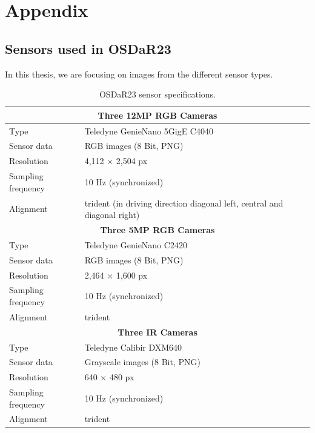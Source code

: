 \documentclass[Master,MDS,english]{BASE/twbook} %
\begin{document}
    
    

\clearpage


\appendix
\chapter{Appendix}

\section{Sensors used in OSDaR23} \label{app:sensors}

In this thesis, we are focusing on images from the different sensor types. 

\begin{table}[H]
  \centering
  \footnotesize
  \begin{tabular}{|l|l|}
    \hline
    \multicolumn{2}{|c|}{\textbf{Three 12MP RGB Cameras}}  \\
    \hline
    Type & Teledyne GenieNano 5GigE C4040  \\
    Sensor data & RGB images (8 Bit, PNG)  \\
    Resolution & 4,112 $\times$ 2,504 px  \\
    Sampling frequency & 10 Hz (synchronized)  \\
    Alignment & trident (in driving direction diagonal left, central and diagonal right)  \\
    \hline
    \multicolumn{2}{|c|}{\textbf{Three 5MP RGB Cameras}}  \\
    \hline
    Type & Teledyne GenieNano C2420  \\
    Sensor data & RGB images (8 Bit, PNG)  \\
    Resolution & 2,464 $\times$ 1,600 px \\
    Sampling frequency & 10 Hz (synchronized)  \\
    Alignment & trident  \\
    \hline
    \multicolumn{2}{|c|}{\textbf{Three IR Cameras}}  \\
    \hline
    Type & Teledyne Calibir DXM640  \\
    Sensor data & Grayscale images (8 Bit, PNG)  \\
    Resolution & 640 $\times$ 480 px  \\
    Sampling frequency & 10 Hz (synchronized)  \\
    Alignment & trident  \\
    \hline
  \end{tabular}
  \caption{OSDaR23 sensor specifications.}
  \label{tab:cameras}
\end{table}
\end{document}
